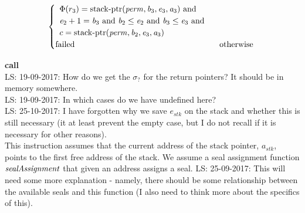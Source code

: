 \documentclass[a3paper]{article}
\newcommand\lau[1]{{\color{purple} \sf \footnotesize {LS: #1}}\\}
\newcommand{\tand}{\text{ and }}
\newcommand{\totherwise}{\text{otherwise }}
\newcommand{\perm}{\var{perm}}
\newcommand{\stkptr}[1]{\mathrm{stack\text{-}ptr}(#1)}
\newcommand{\failed}{\mathrm{failed}}
\newcommand{\var}[1]{\mathit{#1}}
\newcommand{\stk}{\var{stk}}
\newcommand{\baddr}{\var{b}}
\newcommand{\eaddr}{\var{e}}
\newcommand{\aaddr}{\var{a}}
\newcommand{\plainfun}[2]{
  \ifthenelse{\equal{#2}{}}
  {\mathit{#1}}
  {\mathit{#1}(#2)}
}
\newcommand{\sealAss}[1]{\plainfun{sealAssignment}{#1}}
\begin{document}
\begin{align*}
\begin{cases}
\begin{array}[t]{l}
                                  \Phi(r_3) = \stkptr{\perm,\baddr_3,\eaddr_3,\aaddr_3} \tand \\
                                  \eaddr_2 + 1 = \baddr_3 \tand \baddr_2 \leq \eaddr_2 \tand \baddr_3 \leq \eaddr_3 \tand \\
                                  c = \stkptr{\perm,\baddr_2,\eaddr_3,\aaddr_3} \\
                                \end{array}\\
                                \failed & \totherwise
                              \end{cases}
\end{align*}

\noindent\textbf{call}\\
\lau{19-09-2017: How do we get the $\sigma_?$ for the return pointers? It should be in memory somewhere.}
\lau{19-09-2017: In which cases do we have undefined here?}
\lau{25-10-2017: I have forgotten why we save $e_\stk$ on the stack and whether this is still necessary (it at least prevent the empty case, but I do not recall if it is necessary for other reasons).}
This instruction assumes that the current address of the stack pointer, $\aaddr_\stk$, points to the first free address of the stack. We assume a seal assignment function $\sealAss{}$ that given an address assigns a seal.\lau{25-09-2017: This will need some more explanation - namely, there should be some relationship between the available seals and this function (I also need to think more about the specifics of this).}
\end{document}

